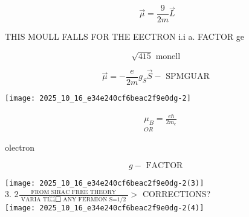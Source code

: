 $$
\vec{\mu}=\frac{9}{2 m} \vec{L}
$$

THIS MOULL FALLS FOR THE EECTRON i.i a. FACTOR ge

$$
\sqrt{415} \text { monell }
$$

$$
\vec{\mu}=-\frac{e}{2 m} g_{S} \vec{S}-\text { SPMGUAR }
$$

\begin{center}
\texttt{[image: 2025\_10\_16\_e34e240cf6beac2f9e0dg-2]}
\end{center}

$$
\begin{aligned}
& \mu_{B}=\frac{e \hbar}{2 m_{e}} \\
& { }_{O R}
\end{aligned}
$$

olectron

$$
g-\text { FACTOR }
$$

\texttt{[image: 2025\_10\_16\_e34e240cf6beac2f9e0dg-2(3)]}\\
3. $2 \frac{\text { FROM SIRAC FREE THEORY }}{\text { VARIA TI⿴囗 ANY FERMION S=1/2 }}>$ CORRECTIONS?\\
\texttt{[image: 2025\_10\_16\_e34e240cf6beac2f9e0dg-2(4)]}

